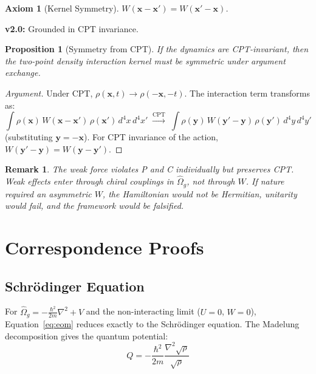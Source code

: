 \documentclass[11pt, a4paper]{article}
\newtheorem{axiom}{Axiom}[section]
\newtheorem{proposition}{Proposition}[section]
\newtheorem{remark}{Remark}[section]
\begin{document}
\begin{axiom}[Kernel Symmetry]
$W(\mathbf{x}-\mathbf{x}') = W(\mathbf{x}'-\mathbf{x})$.
\end{axiom}

\textbf{v2.0:} Grounded in CPT invariance.

\begin{proposition}[Symmetry from CPT]
If the dynamics are CPT-invariant, then the two-point density interaction
kernel must be symmetric under argument exchange.
\end{proposition}

\begin{proof}[Argument]
Under CPT, $\rho(\mathbf{x},t) \to \rho(-\mathbf{x},-t)$. The interaction
term transforms as:
\[
  \int \rho(\mathbf{x})\, W(\mathbf{x}-\mathbf{x}')\, \rho(\mathbf{x}')\, d^4x\, d^4x'
  \;\xrightarrow{\text{CPT}}\;
  \int \rho(\mathbf{y})\, W(\mathbf{y}'-\mathbf{y})\, \rho(\mathbf{y}')\, d^4y\, d^4y'
\]
(substituting $\mathbf{y} = -\mathbf{x}$). For CPT invariance of the action,
$W(\mathbf{y}'-\mathbf{y}) = W(\mathbf{y}-\mathbf{y}')$.
\end{proof}

\begin{remark}
The weak force violates P and C individually but preserves CPT. Weak effects
enter through chiral couplings in $\hat{\Omega}_g$, not through $W$. If
nature required an asymmetric $W$, the Hamiltonian would not be Hermitian,
unitarity would fail, and the framework would be falsified.
\end{remark}

\section{Correspondence Proofs}

\subsection{Schr\"odinger Equation}

For $\hat{\Omega}_g = -\frac{\hbar^2}{2m}\nabla^2 + V$ and the
non-interacting limit ($U = 0$, $W = 0$), Equation~\ref{eq:eom} reduces
exactly to the Schr\"odinger equation. The Madelung decomposition gives
the quantum potential:
\begin{equation}
  Q = -\frac{\hbar^2}{2m}\frac{\nabla^2\sqrt{\rho}}{\sqrt{\rho}}
\end{equation}
\end{document}
